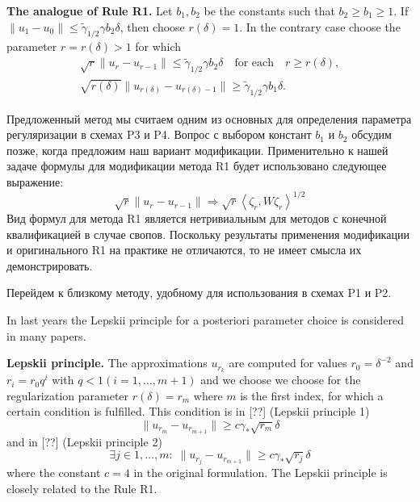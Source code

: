 \documentclass[10pt]{article}
\theoremstyle{definition}
\theoremstyle{remark}
\theoremstyle{plain}
\newcommand{\scalar}[2]{\left<#1,#2\right>}
\begin{document}
\textbf{The analogue of Rule R1.}
Let $b_1,b_2$ be the constants such that $b_2\geqslant b_1 \geqslant 1$. If $\|u_1 - u_0\| \leqslant \tilde{\gamma}_{1/2} \gamma b_2\delta$, then choose $r(\delta) = 1$. In the contrary case choose the parameter $r = r(\delta) >1$ for which 
\begin{gather*}
\sqrt{r} \|u_r - u_{r-1}\| \leqslant 
 \tilde{\gamma}_{1/2} \gamma b_2\delta \quad \text{for each}\quad  r\geqslant r(\delta), \\
\sqrt{r(\delta)}\|u_{r(\delta)} - u_{r(\delta)-1}\| \geqslant \tilde{\gamma}_{1/2} \gamma b_1\delta.
\end{gather*}

Предложенный метод мы считаем одним из основных для определения параметра регуляризации в схемах P3 и P4. Вопрос с выбором констант $b_1$ и $b_2$ обсудим позже, когда предложим наш вариант модификации. 
Применительно к нашей задаче формулы для модификации метода R1 будет использовано следующее выражение:
$$
\sqrt{r}\|u_r- u_{r-1}\| \Longrightarrow \sqrt{r}\scalar{\zeta_r}{W\zeta_r}^{1/2}
$$
Вид формул для метода R1 является нетривиальным для методов с конечной квалификацией в случае свопов. Поскольку результаты применения модификации и оригинального R1 на практике не отличаются, то не имеет смысла их демонстрировать. 

Перейдем к близкому методу, удобному для использования в схемах P1 и P2.

In last years the Lepskii principle for a posteriori parameter choice is considered in many papers.

\textbf{Lepskii principle.}
The approximations $u_{r_k}$ are computed for values $r_0 = \delta^{-2}$ and $r_i = r_0q^i$ with $q<1(i=1,\ldots,m+1)$ and we choose we choose for the regularization parameter $r(\delta) = r_m $ where $m$ is the first index, for which a certain condition is fulfilled. This condition is in [??] (Lepskii principle 1)
$$
\|u_{r_m} - u_{r_{m+1}} \| \geqslant c\gamma_*\sqrt{r_m} \delta
$$
and in [??] (Lepskii principle 2)
$$
\exists j\in1,\ldots, m:\; \|u_{r_j} - u_{r_{m+1}} \| \geqslant c\gamma_*\sqrt{r_j} \delta
$$
where the constant $c = 4$ in the original formulation.
The Lepskii principle is closely related to the Rule R1. 
\end{document}
